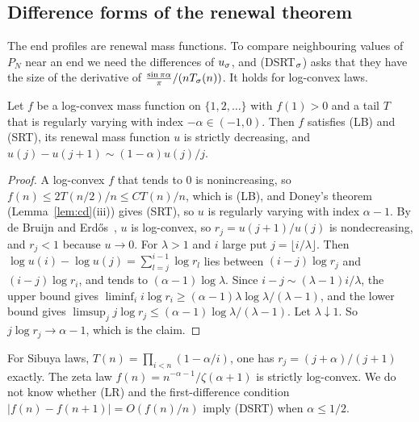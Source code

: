 \subsection{Difference forms of the renewal theorem}\label{sec:dsrt}

The end profiles are renewal mass functions. To compare neighbouring values of $P_N$ near an
end we need the differences of $u_\sigma$, and (DSRT$_\sigma$) asks that they have the size of
the derivative of $\frac{\sin\pi\alpha}\pi/(nT_\sigma(n))$. It holds for log-convex laws.

\begin{lemma}\label{lem:dsrt}
Let $f$ be a log-convex mass function on $\{1,2,\dots\}$ with $f(1)>0$ and a tail $T$ that is
regularly varying with index $-\alpha\in(-1,0)$. Then $f$ satisfies (LB) and (SRT), its renewal
mass function $u$ is strictly decreasing, and $u(j)-u(j+1)\sim(1-\alpha)u(j)/j$.
\end{lemma}

\begin{proof}
A log-convex $f$ that tends to $0$ is nonincreasing, so $f(n)\le2T(n/2)/n\le CT(n)/n$, which is
(LB), and Doney's theorem (Lemma~\ref{lem:cd}(iii)) gives (SRT), so $u$ is regularly varying
with index $\alpha-1$. By de Bruijn and Erd\H{o}s~\cite[Theorem~1]{debruijnerdos1953}, $u$ is
log-convex, so $r_j=u(j+1)/u(j)$ is nondecreasing, and $r_j<1$ because $u\to0$. For $\lambda>1$
and $i$ large put $j=\lfloor i/\lambda\rfloor$. Then
$\log u(i)-\log u(j)=\sum_{l=j}^{i-1}\log r_l$ lies between $(i-j)\log r_j$ and $(i-j)\log r_i$,
and tends to $(\alpha-1)\log\lambda$. Since $i-j\sim(\lambda-1)i/\lambda$, the upper bound gives
$\liminf_ii\log r_i\ge(\alpha-1)\lambda\log\lambda/(\lambda-1)$, and the lower bound gives
$\limsup_jj\log r_j\le(\alpha-1)\log\lambda/(\lambda-1)$. Let
$\lambda\downarrow1$. So $j\log r_j\to\alpha-1$, which is the claim.
\end{proof}

For Sibuya laws, $T(n)=\prod_{i<n}(1-\alpha/i)$, one has $r_j=(j+\alpha)/(j+1)$ exactly. The zeta
law $f(n)=n^{-\alpha-1}/\zeta(\alpha+1)$ is strictly log-convex. We do not know whether
(LR) and the first-difference condition $|f(n)-f(n+1)|=O(f(n)/n)$ imply (DSRT) when
$\alpha\le1/2$.

